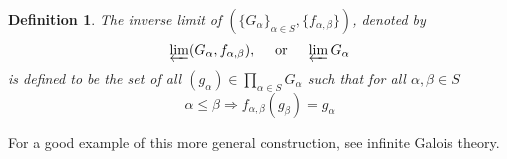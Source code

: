 \documentclass[12pt]{article}
\newtheorem{defn}{Definition}
\begin{document}
\begin{defn}
The \emph{inverse limit} of $(\{G_{\alpha}\}_{\alpha\in
S},\{f_{\alpha,\beta}\})$, denoted by
$$\varprojlim (G_{\alpha},f_{\alpha,\beta}),\quad \text{ or }\quad \varprojlim
G_{\alpha}$$ is defined to be the set of all $(g_{\alpha})\in
\prod_{\alpha\in S} G_{\alpha}$ such that for all $\alpha,\beta
\in S$
$$ \alpha\leq\beta \Rightarrow
f_{\alpha,\beta}(g_{\beta})=g_{\alpha}$$
\end{defn}

For a good example of this more general construction, see infinite
Galois theory.
\end{document}
